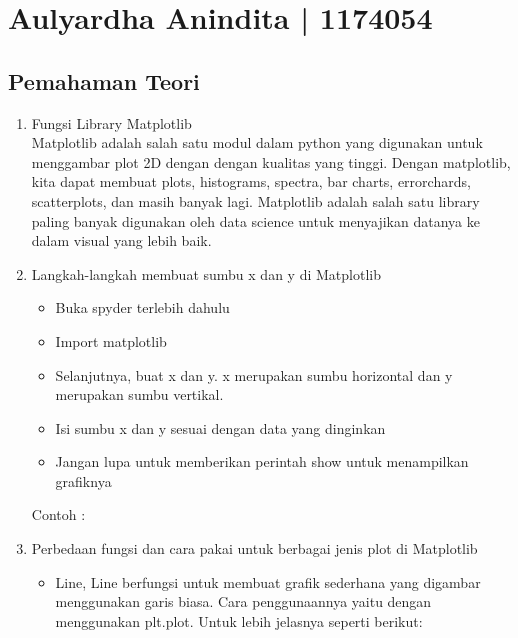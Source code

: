
\section{Aulyardha Anindita | 1174054}
\subsection{Pemahaman Teori}

\begin{enumerate}

\item Fungsi Library Matplotlib\\
Matplotlib adalah salah satu modul dalam python yang digunakan untuk menggambar plot 2D dengan dengan kualitas yang tinggi. Dengan matplotlib, kita dapat membuat plots, histograms, spectra, bar charts, errorchards, scatterplots, dan masih banyak lagi. Matplotlib adalah salah satu library paling banyak digunakan oleh data science untuk menyajikan datanya ke dalam visual yang lebih baik.

\item Langkah-langkah membuat sumbu x dan y di Matplotlib
\begin{itemize}
\item Buka spyder terlebih dahulu
\item Import matplotlib
\item Selanjutnya, buat x dan y. x merupakan sumbu horizontal dan y merupakan sumbu vertikal.
\item Isi sumbu x dan y sesuai dengan data yang dinginkan
\item Jangan lupa untuk memberikan perintah show untuk menampilkan grafiknya
\end{itemize}
Contoh :\\



\item Perbedaan fungsi dan cara pakai untuk berbagai jenis plot di Matplotlib
\begin{itemize}
\item Line, Line berfungsi untuk membuat grafik sederhana yang digambar menggunakan garis biasa. Cara penggunaannya yaitu dengan menggunakan plt.plot. Untuk lebih jelasnya seperti berikut:\\



\end{itemize}
\end{enumerate}

